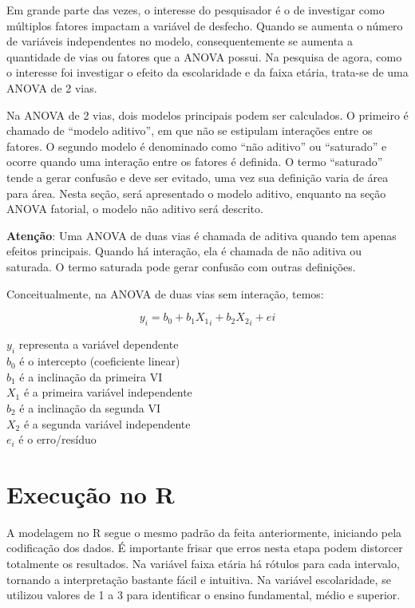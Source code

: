 \documentclass[
]{book}
\begin{document}
Em grande parte das vezes, o interesse do pesquisador é o de investigar como múltiplos fatores impactam a variável de desfecho. Quando se aumenta o número de variáveis independentes no modelo, consequentemente se aumenta a quantidade de vias ou fatores que a ANOVA possui. Na pesquisa de agora, como o interesse foi investigar o efeito da escolaridade e da faixa etária, trata-se de uma ANOVA de 2 vias.

Na ANOVA de 2 vias, dois modelos principais podem ser calculados. O primeiro é chamado de ``modelo aditivo'', em que não se estipulam interações entre os fatores. O segundo modelo é denominado como ``não aditivo'' ou ``saturado'' e ocorre quando uma interação entre os fatores é definida. O termo ``saturado'' tende a gerar confusão e deve ser evitado, uma vez sua definição varia de área para área. Nesta seção, será apresentado o modelo aditivo, enquanto na seção ANOVA fatorial, o modelo não aditivo será descrito.

\textbf{Atenção}: Uma ANOVA de duas vias é chamada de aditiva quando tem apenas efeitos principais. Quando há interação, ela é chamada de não aditiva ou saturada. O termo saturada pode gerar confusão com outras definições.

Conceitualmente, na ANOVA de duas vias sem interação, temos:

\[y_i = b_0 + b_1X{_1}_i + b_2X{_2}_i + ei\]

\(y_i\) representa a variável dependente\\
\(b_0\) é o intercepto (coeficiente linear)\\
\(b_1\) é a inclinação da primeira VI\\
\(X_1\) é a primeira variável independente\\
\(b_2\) é a inclinação da segunda VI\\
\(X_2\) é a segunda variável independente\\
\(e_i\) é o erro/resíduo

\hypertarget{execuuxe7uxe3o-no-r-8}{%
\section{Execução no R}\label{execuuxe7uxe3o-no-r-8}}

A modelagem no R segue o mesmo padrão da feita anteriormente, iniciando pela codificação dos dados. É importante frisar que erros nesta etapa podem distorcer totalmente os resultados. Na variável faixa etária há rótulos para cada intervalo, tornando a interpretação bastante fácil e intuitiva. Na variável escolaridade, se utilizou valores de 1 a 3 para identificar o ensino fundamental, médio e superior.
\end{document}
